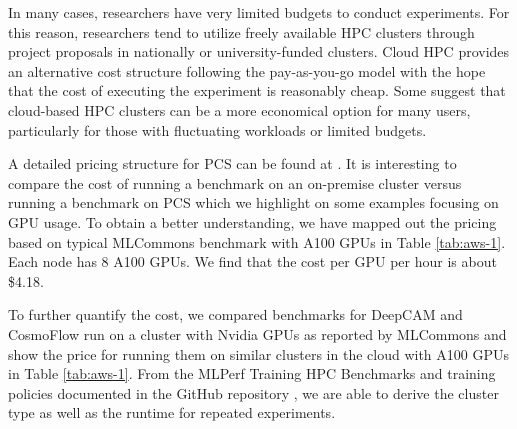 In many cases, researchers have very limited budgets to conduct experiments. For this reason, researchers tend to utilize freely available HPC clusters through project proposals in nationally or university-funded clusters. Cloud HPC provides an alternative cost structure following the pay-as-you-go model with the hope that the cost of executing the experiment is reasonably cheap.  Some suggest  \citep{munhoz_performance_2023} that cloud-based HPC clusters can be a more economical option for many users, particularly for those with fluctuating workloads or limited budgets. 

A detailed pricing structure for PCS can be found at \citep{www-aws-pricing}. It is interesting to compare the cost of running a benchmark on an on-premise cluster versus running a benchmark on PCS which we highlight on some examples focusing on GPU usage. To obtain a better understanding, we have mapped out the pricing based on typical MLCommons benchmark with A100 GPUs in Table \ref{tab:aws-1}. Each node has 8 A100 GPUs. We find that the cost per GPU per hour is about \$4.18.


To further quantify the cost, we compared benchmarks for DeepCAM and CosmoFlow run on a cluster with Nvidia GPUs \citep{mlperf-nvidia-benchmark} as reported by MLCommons and show the price for running them on similar clusters in the cloud with A100 GPUs in Table \ref{tab:aws-1}. From the MLPerf Training HPC Benchmarks \citep{mlcommonsBenchmarkMLPerf} and training policies documented in the GitHub repository \citep{mlperftrainingpolicies}, we are able to derive the cluster type as well as the runtime for repeated experiments. 


